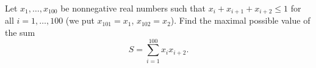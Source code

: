 Let $x_1, \ldots, x_{100}$ be nonnegative real numbers such that $x_i + x_{i+1} + x_{i+2} \leq 1$ for all $i = 1, \ldots, 100$ (we put $x_{101} = x_1$, $x_{102} = x_2$). Find the maximal possible value of the sum
\[
S = \sum_{i=1}^{100} x_i x_{i+2}.
\]
